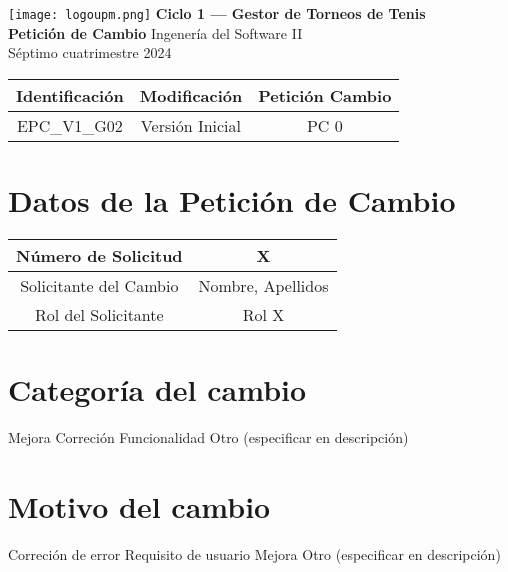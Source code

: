 \documentclass[titlepage,a4paper]{article}
\begin{document}
\begin{titlepage} %
	\hfill\texttt{[image: logoupm.png]}
    \centering
    \vfill
    \Huge \textbf{Ciclo 1 — Gestor de Torneos de Tenis} \\
    \vskip2cm
            \textbf{Petición de Cambio}
    \vskip2cm
    \Large Ingenería del Software II\\
    Séptimo cuatrimestre 2024 
    \vfill
  \begin{tabular}{ | c | c | c | } %
    \hline
    Identificación & Modificación & Petición Cambio \\ \hline 
    EPC\_V1\_G02 & Versión Inicial & PC 0 \\ \hline   
\end{tabular}

    \vfill
    \vfill
\end{titlepage}


\newpage
\large
\section{Datos de la Petición de Cambio} 
 \begin{tabular}{ | c | c |}
  \hline
    Número de Solicitud & X \\ \hline
    Solicitante del Cambio & Nombre, Apellidos \\ \hline
    Rol del Solicitante & Rol X \\ \hline
  \end{tabular}
\vspace{1cm}
\large
\section{Categoría del cambio}
      Mejora
      Correción
      Funcionalidad
      Otro (especificar en descripción)

\vspace{1cm}
\large
\section{Motivo del cambio}
     Correción de error
     Requisito de usuario
     Mejora 
     Otro (especificar en descripción)

\vspace{1cm}
\large
\end{document}
